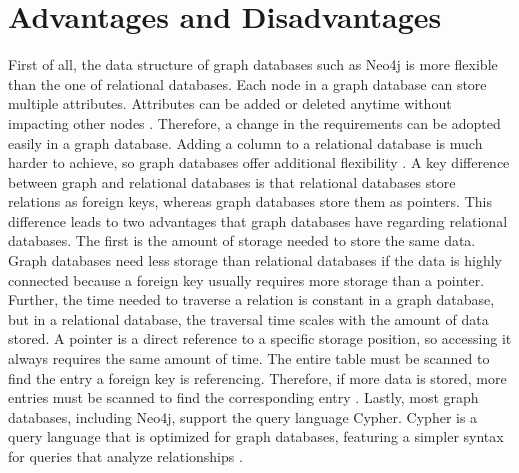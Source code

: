 \section{Advantages and Disadvantages} \label{sec:advantagesDisadvantagesNeo4j}

First of all, the data structure of graph databases such as Neo4j is more flexible than the one of relational databases. Each node in a graph database can store multiple attributes. Attributes can be added or deleted anytime without impacting other nodes \parencite{adv_and_disadv_neo4j}. Therefore, a change in the requirements can be adopted easily in a graph database. Adding a column to a relational database is much harder to achieve, so graph databases offer additional flexibility \parencite{diff_rela_neo4j}.
A key difference between graph and relational databases is that relational databases store relations as foreign keys, whereas graph databases store them as pointers. This difference leads to two advantages that graph databases have regarding relational databases. The first is the amount of storage needed to store the same data. Graph databases need less storage than relational databases if the data is highly connected because a foreign key usually requires more storage than a pointer. Further, the time needed to traverse a relation is constant in a graph database, but in a relational database, the traversal time scales with the amount of data stored. A pointer is a direct reference to a specific storage position, so accessing it always requires the same amount of time. The entire table must be scanned to find the entry a foreign key is referencing. Therefore, if more data is stored, more entries must be scanned to find the corresponding entry \parencite{diff_rela_neo4j}.
Lastly, most graph databases, including Neo4j, support the query language Cypher. Cypher is a query language that is optimized for graph databases, featuring a simpler syntax for queries that analyze relationships \parencite{use_cases_neo4j}.

